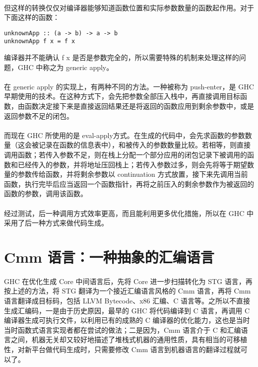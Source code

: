 \documentclass{article}
\begin{document}
	\paragraph{}
	但这样的转换仅仅对编译器能够知道函数位置和实际参数数量的函数起作用。对于下面这样的函数：
\begin{verbatim}
unknownApp :: (a -> b) -> a -> b
unknownApp f x = f x
\end{verbatim}
	编译器并不能确认 f x 是否是参数完全的，所以需要特殊的机制来处理这样的问题，GHC 中称之为 generic apply。
	\paragraph{}
	在 generic apply 的实现上，有两种不同的方法。一种被称为 push-enter，是 GHC 早期使用的技术。在这种方式下，会先把参数全部压入栈中，再直接调用目标函数，由函数决定接下来是直接返回结果还是将返回的函数应用到剩余参数中，或是返回参数不足的闭包。
	\paragraph{}
	而现在 GHC 所使用的是 eval-apply方式。在生成的代码中，会先求函数的参数数量（这会被记录在函数的信息表中），和被传入的参数数量比较。若相等，则直接调用函数；若传入参数不足，则在栈上分配一个部分应用的闭包记录下被调用的函数和已经传入的参数，并将地址压回栈上；若传入参数过多，则会先将等于期望数量的参数传给函数，并将剩余参数以 continuation 方式放置，接下来先调用当前函数，执行完毕后应当返回一个函数指针，再将之前压入的剩余参数作为被返回的函数的参数，调用该函数。
	\paragraph{}
	经过测试，后一种调用方式效率更高，而且能利用更多优化措施，所以在 GHC 中采用了后一种方式来做代码生成。
	
	
	\section{Cmm 语言：一种抽象的汇编语言\cite{c-a-portable-assembly-language}}
	\paragraph{}
	GHC 在优化生成 Core 中间语言后，先将 Core 进一步扫描转化为 STG 语言，再按上述的方法，将 STG 翻译为一个接近汇编语言风格的 Cmm 语言，再将 Cmm 语言翻译成目标码，包括 LLVM Bytecode、x86 汇编、C 语言等。之所以不直接生成汇编码，一是由于历史原因，最早的 GHC 将代码编译到 C 语言，再调用 C 编译器生成可执行文件，以利用已有的成熟的 C 编译器的优化能力，这也是当时当时函数式语言实现者都在尝试的做法；二是因为，Cmm 语言介于 C 和汇编语言之间，机器无关却又较好地描述了堆栈式机器的通用性质，具有相当的可移植性，对新平台做代码生成时，只需要修改 Cmm 语言到机器语言的翻译过程就可以了。
\end{document}
